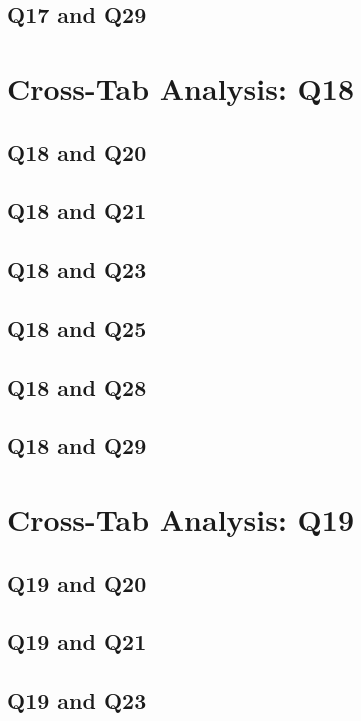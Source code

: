 \documentclass{report}
\begin{document}
\section{Q17 and Q29}\clearpage

\chapter{Cross-Tab Analysis: Q18}

\section{Q18 and Q20}\clearpage
\section{Q18 and Q21}\clearpage
\section{Q18 and Q23}\clearpage
\section{Q18 and Q25}\clearpage
\section{Q18 and Q28}\clearpage
\section{Q18 and Q29}\clearpage

\chapter{Cross-Tab Analysis: Q19}

\section{Q19 and Q20}\clearpage
\section{Q19 and Q21}\clearpage
\section{Q19 and Q23}\clearpage
\end{document}
